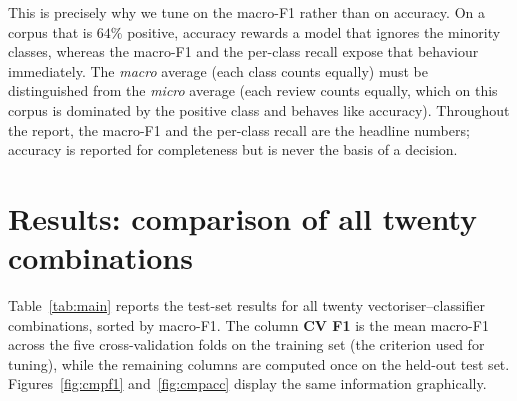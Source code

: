 \documentclass[11pt,a4paper]{article}
\begin{document}
This is precisely why we tune on the macro-F1 rather than on accuracy. On a corpus that
is $64\%$ positive, accuracy rewards a model that ignores the minority classes, whereas
the macro-F1 and the per-class recall expose that behaviour immediately. The
\emph{macro} average (each class counts equally) must be distinguished from the
\emph{micro} average (each review counts equally, which on this corpus is dominated by
the positive class and behaves like accuracy). Throughout the report, the macro-F1 and
the per-class recall are the headline numbers; accuracy is reported for completeness but
is never the basis of a decision.

\section{Results: comparison of all twenty combinations}
\label{sec:results}
Table~\ref{tab:main} reports the test-set results for all twenty vectoriser--classifier
combinations, sorted by macro-F1. The column \textbf{CV F1} is the mean macro-F1 across
the five cross-validation folds on the training set (the criterion used for tuning),
while the remaining columns are computed once on the held-out test set.
Figures~\ref{fig:cmpf1} and~\ref{fig:cmpacc} display the same information graphically.
\end{document}
